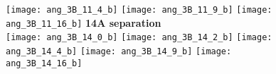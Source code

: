 \documentclass[journal=acsnano,manuscript=article]{achemso}
\begin{document}
\begin{figure}[h!]
	\texttt{[image: ang\_3B\_11\_4\_b]}
	\texttt{[image: ang\_3B\_11\_9\_b]}
	\texttt{[image: ang\_3B\_11\_16\_b]}
	\textbf{14A separation} \\
	\texttt{[image: ang\_3B\_14\_0\_b]} 
	\texttt{[image: ang\_3B\_14\_2\_b]}
	\texttt{[image: ang\_3B\_14\_4\_b]}
	\texttt{[image: ang\_3B\_14\_9\_b]}
	\texttt{[image: ang\_3B\_14\_16\_b]}
	\label{fig:ang}
\end{figure}
\end{document}
